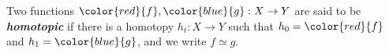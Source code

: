 \documentclass[preview]{standalone}
\begin{document}
\begin{center}
Two functions $\color{red}{f},\color{blue}{g} : X\to Y$ are said to be \textbf{\textit{homotopic}} if there is a homotopy $h_t : X\to Y$ such that $h_0=\color{red}{f}$ and $h_1=\color{blue}{g}$, and we write $f\simeq g$.
\end{center}
\end{document}
